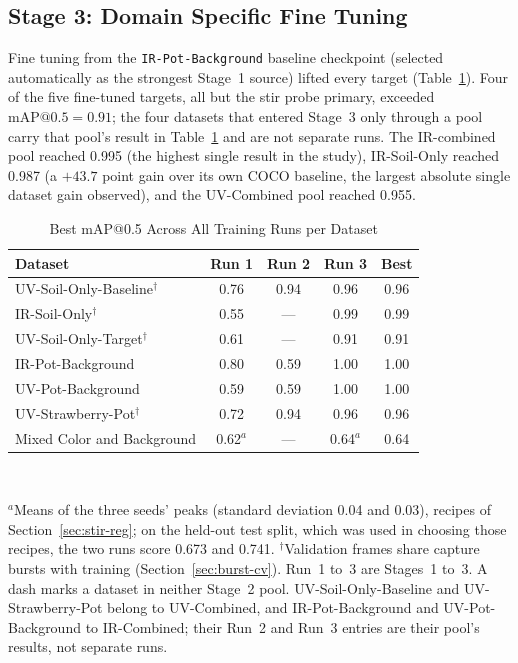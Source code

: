 ﻿\documentclass[journal]{IEEEtran}
\begin{document}
\subsection{Stage 3: Domain Specific Fine Tuning}
Fine tuning from the \texttt{IR-Pot-Background} baseline checkpoint (selected automatically as the strongest Stage~1 source) lifted every target (Table~\ref{tab:best}). Four of the five fine-tuned targets, all but the stir probe primary, exceeded $\text{mAP@0.5}=0.91$; the four datasets that entered Stage~3 only through a pool carry that pool's result in Table~\ref{tab:best} and are not separate runs. The IR-combined pool reached 0.995 (the highest single result in the study), IR-Soil-Only reached 0.987 (a $+43.7$ point gain over its own COCO baseline, the largest absolute single dataset gain observed), and the UV-Combined pool reached 0.955.

\begin{table}[!t]
\renewcommand{\arraystretch}{1.3}
\caption{Best mAP@0.5 Across All Training Runs per Dataset}
\label{tab:best}
\centering
\begin{tabular}{l c c c c}
\toprule
\textbf{Dataset} & \textbf{Run 1} & \textbf{Run 2} & \textbf{Run 3} & \textbf{Best} \\
\midrule
UV-Soil-Only-Baseline$^{\dagger}$ & 0.76 & 0.94 & 0.96 & 0.96 \\
IR-Soil-Only$^{\dagger}$ & 0.55 & --- & 0.99 & 0.99 \\
UV-Soil-Only-Target$^{\dagger}$ & 0.61 & --- & 0.91 & 0.91 \\
IR-Pot-Background & 0.80 & 0.59 & 1.00 & 1.00 \\
UV-Pot-Background & 0.59 & 0.59 & 1.00 & 1.00 \\
UV-Strawberry-Pot$^{\dagger}$ & 0.72 & 0.94 & 0.96 & 0.96 \\
Mixed Color and Background & 0.62$^{a}$ & --- & 0.64$^{a}$ & 0.64 \\
\bottomrule
\end{tabular}
\\[2pt]
\parbox{\columnwidth}{\footnotesize $^{a}$Means of the three seeds' peaks (standard deviation 0.04 and 0.03), recipes of Section~\ref{sec:stir-reg}; on the held-out test split, which was used in choosing those recipes, the two runs score 0.673 and 0.741. $^{\dagger}$Validation frames share capture bursts with training (Section~\ref{sec:burst-cv}). Run~1 to~3 are Stages~1 to~3. A dash marks a dataset in neither Stage~2 pool. UV-Soil-Only-Baseline and UV-Strawberry-Pot belong to UV-Combined, and IR-Pot-Background and UV-Pot-Background to IR-Combined; their Run~2 and Run~3 entries are their pool's results, not separate runs.}
\end{table}
\end{document}
